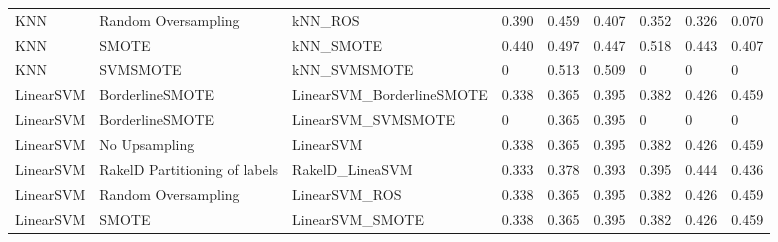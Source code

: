 \begin{tabular}{lllllllll}
                            KNN &           Random Oversampling &                                      kNN\_ROS & 0.390 &                     0.459 &                 0.407 &                  0.352 &                                   0.326 &     0.070 \\
                            KNN &                         SMOTE &                                    kNN\_SMOTE & 0.440 &                     0.497 &                 0.447 &                  0.518 &                                   0.443 &     0.407 \\
                            KNN &                      SVMSMOTE &                                 kNN\_SVMSMOTE &     0 &                     0.513 &                 0.509 &                      0 &                                       0 &         0 \\
                      LinearSVM &               BorderlineSMOTE &                    LinearSVM\_BorderlineSMOTE & 0.338 &                     0.365 &                 0.395 &                  0.382 &                                   0.426 &     0.459 \\
                      LinearSVM &               BorderlineSMOTE &                           LinearSVM\_SVMSMOTE &     0 &                     0.365 &                 0.395 &                      0 &                                       0 &         0 \\
                      LinearSVM &                 No Upsampling &                                    LinearSVM & 0.338 &                     0.365 &                 0.395 &                  0.382 &                                   0.426 &     0.459 \\
                      LinearSVM & RakelD Partitioning of labels &                              RakelD\_LineaSVM & 0.333 &                     0.378 &                 0.393 &                  0.395 &                                   0.444 &     0.436 \\
                      LinearSVM &           Random Oversampling &                                LinearSVM\_ROS & 0.338 &                     0.365 &                 0.395 &                  0.382 &                                   0.426 &     0.459 \\
                      LinearSVM &                         SMOTE &                              LinearSVM\_SMOTE & 0.338 &                     0.365 &                 0.395 &                  0.382 &                                   0.426 &     0.459 \\

\end{tabular}
